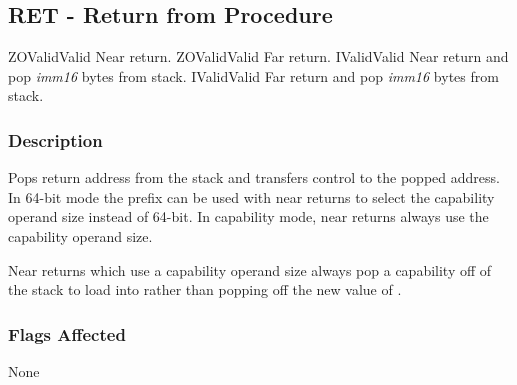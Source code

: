 \clearpage
{}
{}
\subsection*{RET - Return from Procedure}

\begin{x86opcodetable}
  {ZO}{Valid}{Valid}
  {Near return.}
  {ZO}{Valid}{Valid}
  {Far return.}
  {I}{Valid}{Valid}
  {Near return and pop \emph{imm16} bytes from stack.}
  {I}{Valid}{Valid}
  {Far return and pop \emph{imm16} bytes from stack.}
\end{x86opcodetable}

\begin{x86opentable}
\end{x86opentable}

\subsubsection*{Description}

Pops return address from the stack and transfers control to the popped
address.  In 64-bit mode the  prefix can be used with
near returns to select the capability operand size instead of 64-bit.
In capability mode, near returns always use the capability operand
size.

Near returns which use a capability operand size always pop a
capability off of the stack to load into \CIP{} rather than popping
off the new value of \RIP{}.

\subsubsection*{Flags Affected}

None
